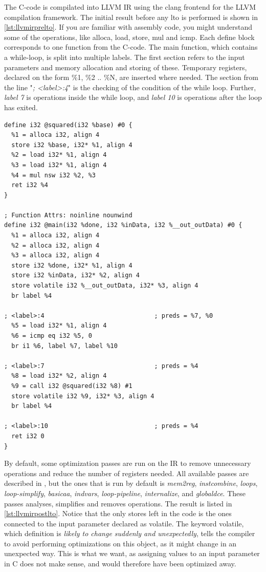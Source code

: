 The C-code is compilated into LLVM IR using the clang frontend for the LLVM compilation framework. The initial result before any \gls{lto} is performed is shown in \cref{lst:llvmirprelto}. If you are familiar with assembly code, you might understand some of the operations, like alloca, load, store, mul and icmp. Each define block corresponds to one function from the C-code. The main function, which contains a while-loop, is split into multiple labels. The first section refers to the input parameters and memory allocation and storing of these. Temporary registers, declared on the form \%1, \%2 .. \%N, are inserted where needed. The section from the line "\textit{; <label>:4}" is the checking of the condition of the while loop. Further, \textit{label 7} is operations inside the while loop, and \textit{label 10} is operations after the loop has exited.
\lstset{language=llvm,style=LLVMstyle}
\begin{lstlisting}[caption={LLVM IR before LTO},label=lst:llvmirprelto]
define i32 @squared(i32 %base) #0 {
  %1 = alloca i32, align 4
  store i32 %base, i32* %1, align 4
  %2 = load i32* %1, align 4
  %3 = load i32* %1, align 4
  %4 = mul nsw i32 %2, %3
  ret i32 %4
}

; Function Attrs: noinline nounwind
define i32 @main(i32 %done, i32 %inData, i32 %__out_outData) #0 {
  %1 = alloca i32, align 4
  %2 = alloca i32, align 4
  %3 = alloca i32, align 4
  store i32 %done, i32* %1, align 4
  store i32 %inData, i32* %2, align 4
  store volatile i32 %__out_outData, i32* %3, align 4
  br label %4

; <label>:4                              ; preds = %7, %0
  %5 = load i32* %1, align 4
  %6 = icmp eq i32 %5, 0
  br i1 %6, label %7, label %10

; <label>:7                              ; preds = %4
  %8 = load i32* %2, align 4
  %9 = call i32 @squared(i32 %8) #1
  store volatile i32 %9, i32* %3, align 4
  br label %4

; <label>:10                             ; preds = %4
  ret i32 0
}
\end{lstlisting}
By default, some optimization passes are run on the IR to remove unnecessary operations and reduce the number of registers needed. All available passes are described in \cite{llvmpasses}, but the ones that is run by default is \textit{mem2reg}, \textit{instcombine}, \textit{loops}, \textit{loop-simplify}, \textit{basicaa}, \textit{indvars}, \textit{loop-pipeline}, \textit{internalize}, and \textit{globaldce}. These passes analyses, simplifies and removes operations. The result is listed in \cref{lst:llvmirpostlto}. Notice that the only stores left in the code is the ones connected to the input parameter declared as volatile. The keyword volatile, which definition is \textit{likely to change suddenly and unexpectedly}, tells the compiler to avoid performing optimizations on this object, as it might change in an unexpected way. This is what we want, as assigning values to an input parameter in C does not make sense, and would therefore have been optimized away. 

